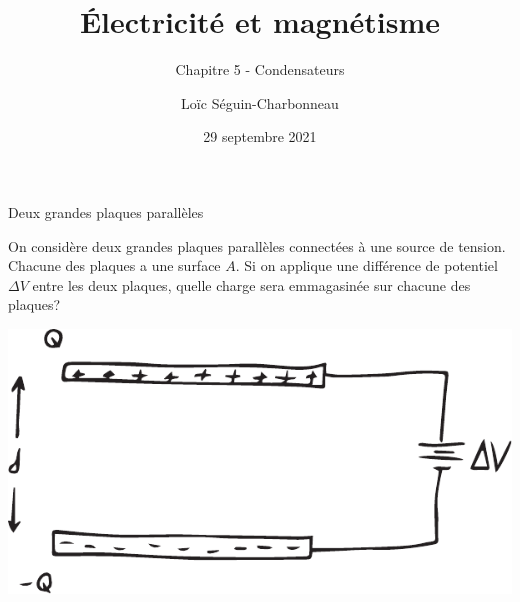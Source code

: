 \documentclass{beamer}
\title{Électricité et magnétisme}
\subtitle{Chapitre 5 - Condensateurs}
\date{29 septembre 2021}
\author{Loïc Séguin-Charbonneau}
\institute{Cégep Édouard-Montpetit}
\begin{document}
\maketitle


\begin{frame}{Deux grandes plaques parallèles}

On considère deux grandes plaques parallèles connectées à une source de
tension. Chacune des plaques a une surface $A$. Si on applique une différence
de potentiel $\Delta V$ entre les deux plaques, quelle charge sera emmagasinée
sur chacune des plaques?

\begin{center}
  \includegraphics[scale=0.4]{figures/condensateur-plan.pdf}
\end{center}

\end{frame}
\end{document}

